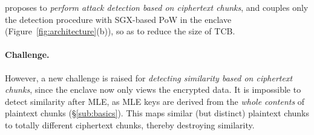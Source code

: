 \sysnameF proposes to {\em perform attack detection based on ciphertext chunks}, and couples only the detection procedure with SGX-based PoW in the enclave (Figure~\ref{fig:architecture}(b)), so as to reduce the size of TCB.





\paragraph{Challenge.}
However, a new challenge is raised for {\em detecting similarity based on ciphertext chunks}, since the enclave now only views the encrypted data.  It is impossible to detect similarity after MLE, as MLE keys are derived from the {\em whole contents} of plaintext chunks (\S\ref{sub:basics}). This maps similar (but distinct) plaintext chunks to totally different ciphertext chunks, thereby destroying similarity.




